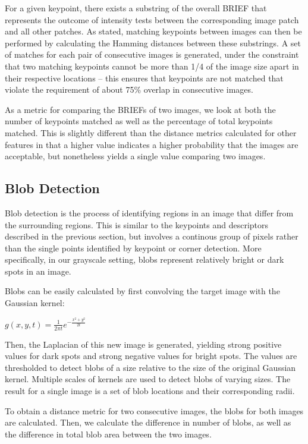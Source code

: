 For a given keypoint, there exists a substring of the overall BRIEF that represents the outcome of intensity tests between the corresponding image patch and all other patches.
As stated, matching keypoints between images can then be performed by calculating the Hamming distances between these substrings.
A set of matches for each pair of consecutive images is generated, under the constraint that two matching keypoints cannot be more than 1/4 of the image size apart in their respective locations -- this ensures that keypoints are not matched that violate the requirement of about 75\% overlap in consecutive images.


As a metric for comparing the BRIEFs of two images, we look at both the number of keypoints matched as well as the percentage of total keypoints matched. 
This is slightly different than the distance metrics calculated for other features in that a higher value indicates a higher probability that the images are acceptable, but nonetheless yields a single value comparing two images.


\subsection{Blob Detection}

Blob detection is the process of identifying regions in an image that differ from the surrounding regions.
This is similar to the keypoints and descriptors described in the previous section, but involves a continous group of pixels rather than the single points identified by keypoint or corner detection.
More specifically, in our grayscale setting, blobs represent relatively bright or dark spots in an image.

Blobs can be easily calculated by first convolving the target image with the Gaussian kernel:

\begin{center}
$g(x, y, t) = \frac{1}{2\pi t}e^{-\frac{x^2 + y^2}{2t}} $
\end{center}

Then, the Laplacian of this new image is generated, yielding strong positive values for dark spots and strong negative values for bright spots.
The values are thresholded to detect blobs of a size relative to the size of the original Gaussian kernel.
Multiple scales of kernels are used to detect blobs of varying sizes.
The result for a single image is a set of blob locations and their corresponding radii.

To obtain a distance metric for two consecutive images, the blobs for both images are calculated.
Then, we calculate the difference in number of blobs, as well as the difference in total blob area between the two images.

